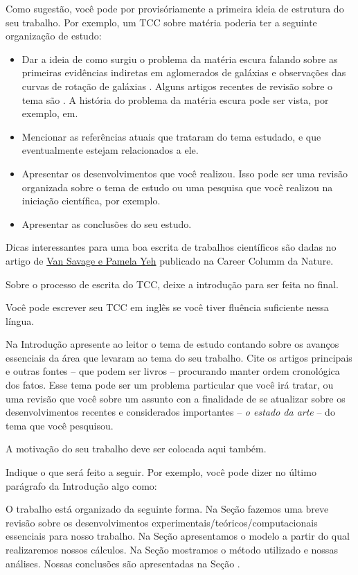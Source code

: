 \documentclass[prd,amsfonts,onecolumn,superscriptaddress,aps,nofootinbib,11pt]{revtex4}
\begin{document}
Como sugestão, você pode por provisóriamente a primeira ideia de estrutura
do seu trabalho. Por exemplo, um TCC sobre matéria poderia ter a seguinte
organização de estudo:
\begin{itemize}
\item Dar a ideia de como surgiu o problema da matéria escura falando sobre
as primeiras evidências indiretas em aglomerados de galáxias
e observações das curvas de rotação de galáxias .
Alguns artigos recentes de revisão sobre o tema são .
A história do problema da matéria escura pode ser vista, por exemplo,
em.
\item Mencionar as referências atuais que trataram do tema estudado, e que
eventualmente estejam relacionados a ele. 
\item Apresentar os desenvolvimentos que você realizou. Isso pode ser uma
revisão organizada sobre o tema de estudo ou uma pesquisa que você
realizou na iniciação científica, por exemplo.
\item Apresentar as conclusões do seu estudo.
\end{itemize}

Dicas interessantes para uma boa escrita de trabalhos científicos
são dadas no artigo de \href{https://www.nature.com/articles/d41586-019-02918-5?utm_source=Nature+Briefing&utm_campaign=c699f7417d-briefing-dy-20190927&utm_medium=email&utm_term=0_c9dfd39373-c699f7417d-43483813}{Van Savage e Pamela Yeh}
publicado na Career Columm da Nature.

Sobre o processo de escrita do TCC, deixe a introdução para ser feita no final. 

Você pode escrever seu TCC em inglês se você tiver fluência suficiente nessa língua.

Na Introdução apresente ao leitor o tema de estudo contando sobre
os avanços essenciais da área que levaram ao tema do seu trabalho.
Cite os artigos principais e outras fontes -- que podem
ser livros -- procurando manter ordem cronológica dos fatos.
Esse tema pode ser um problema particular que você irá tratar, ou
uma revisão que você sobre um assunto con a finalidade de se atualizar
sobre os desenvolvimentos recentes e considerados importantes --
\emph{o estado da arte} -- do tema que você pesquisou.

A motivação do seu trabalho deve ser colocada aqui também. 

Indique o que será feito a seguir. Por exemplo, você pode dizer no último parágrafo 
da Introdução algo como: 

O trabalho está organizado da seguinte forma. Na Seção  fazemos 
uma breve revisão sobre os desenvolvimentos experimentais/teóricos/computacionais essenciais 
para nosso trabalho. Na Seção apresentamos o modelo 
a partir do qual realizaremos nossos cálculos. Na Seção 
mostramos o método utilizado 
e nossas análises. Nossas conclusões são apresentadas na Seção .
\end{document}
